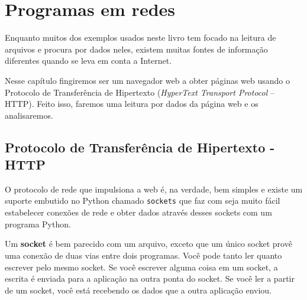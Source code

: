 
\chapter{Programas em redes}

Enquanto muitos dos exemplos usados neste livro tem focado na leitura de
arquivos e procura por dados neles, existem muitas fontes de informação
diferentes quando se leva em conta a Internet.

Nesse capítulo fingiremos ser um navegador web a obter páginas
web usando o Protocolo de Transferência de Hipertexto ({\it HyperText Transport
Protocol} -- HTTP).  Feito isso, faremos uma leitura
por dados da página web e os analisaremos.

\section{Protocolo de Transferência de Hipertexto - HTTP}

O protocolo de rede que impulsiona a web é, na verdade, bem simples e 
existe um suporte embutido no Python chamado {\tt sockets} que faz com seja
muito fácil estabelecer conexões de rede e obter dados através desses
sockets com um programa Python.

Um {\bf socket} é bem parecido com um arquivo, exceto que um único socket
provê uma conexão de duas vias entre dois programas.  Você pode tanto ler
quanto escrever pelo mesmo socket. Se você escrever alguma coisa em um
socket, a escrita é enviada para a aplicação na outra ponta do socket.
Se você ler a partir de um socket, você está recebendo os dados que a outra
aplicação enviou.

